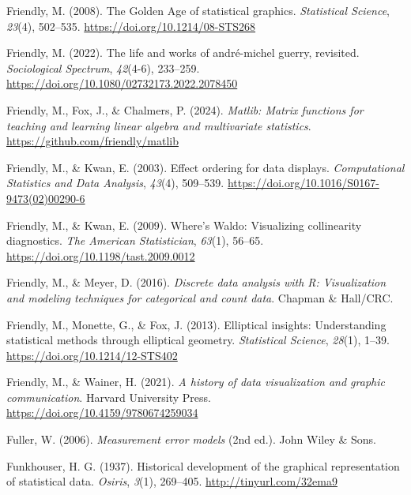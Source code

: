 \documentclass[
  letterpaper,
  10pt,
  krantz2]{krantz}
\newlength{\cslhangindent}
\newenvironment{CSLReferences}[2] %
 {\begin{list}{}{%
  \setlength{\itemindent}{0pt}
  \setlength{\leftmargin}{0pt}
  \setlength{\parsep}{0pt}
  \ifodd #1
   \setlength{\leftmargin}{\cslhangindent}
   \setlength{\itemindent}{-1\cslhangindent}
  \fi
  \setlength{\itemsep}{#2\baselineskip}}}
 {\end{list}}
\begin{document}
\begin{CSLReferences}{1}{0}
Friendly, M. (2008). The {Golden Age} of statistical graphics.
\emph{Statistical Science}, \emph{23}(4), 502--535.
\url{https://doi.org/10.1214/08-STS268}

Friendly, M. (2022). The life and works of andr{é}-michel guerry,
revisited. \emph{Sociological Spectrum}, \emph{42}(4-6), 233--259.
\url{https://doi.org/10.1080/02732173.2022.2078450}

Friendly, M., Fox, J., \& Chalmers, P. (2024). \emph{Matlib: Matrix
functions for teaching and learning linear algebra and multivariate
statistics}. \url{https://github.com/friendly/matlib}

Friendly, M., \& Kwan, E. (2003). Effect ordering for data displays.
\emph{Computational Statistics and Data Analysis}, \emph{43}(4),
509--539. \url{https://doi.org/10.1016/S0167-9473(02)00290-6}

Friendly, M., \& Kwan, E. (2009). Where's {Waldo}: Visualizing
collinearity diagnostics. \emph{The American Statistician},
\emph{63}(1), 56--65. \url{https://doi.org/10.1198/tast.2009.0012}

Friendly, M., \& Meyer, D. (2016). \emph{Discrete data analysis with
{R}: Visualization and modeling techniques for categorical and count
data}. Chapman \& Hall/CRC.

Friendly, M., Monette, G., \& Fox, J. (2013). Elliptical insights:
Understanding statistical methods through elliptical geometry.
\emph{Statistical Science}, \emph{28}(1), 1--39.
\url{https://doi.org/10.1214/12-STS402}

Friendly, M., \& Wainer, H. (2021). \emph{A history of data
visualization and graphic communication}. Harvard University Press.
\url{https://doi.org/10.4159/9780674259034}

Fuller, W. (2006). \emph{Measurement error models} (2nd ed.). John Wiley
\& Sons.

Funkhouser, H. G. (1937). Historical development of the graphical
representation of statistical data. \emph{Osiris}, \emph{3}(1),
269--405. \url{http://tinyurl.com/32ema9}


\end{CSLReferences}
\end{document}
